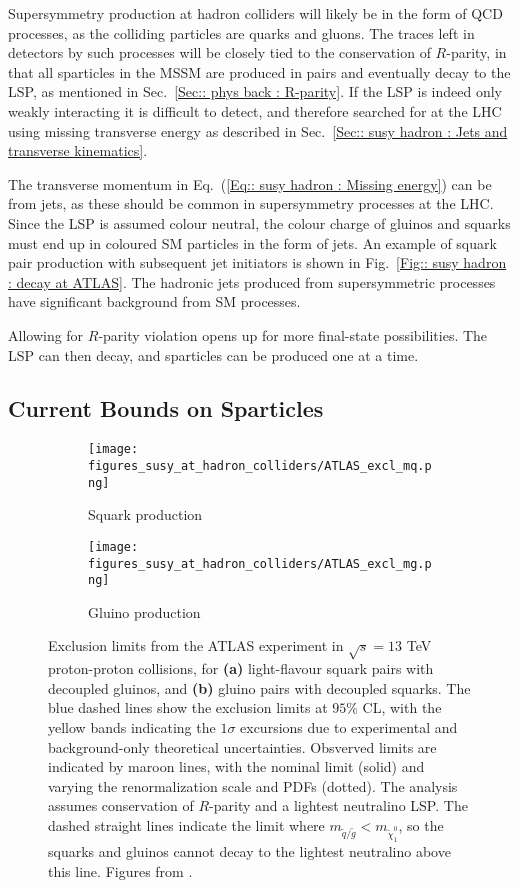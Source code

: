 \documentclass[twoside,english]{uiofysmaster}
\begin{document}
{Supersymmetry production at hadron colliders will likely be in the form of QCD processes, as the colliding particles are quarks and gluons. The traces left in detectors by such processes will be closely tied to the conservation of $R$-parity, in that all sparticles in the MSSM are produced in pairs and eventually decay to the LSP, as mentioned in Sec.~\ref{Sec:: phys back : R-parity}. If the LSP is indeed only weakly interacting it is difficult to detect, and therefore searched for at the LHC using missing transverse energy as described in Sec.~\ref{Sec:: susy hadron : Jets and transverse kinematics}. 

The transverse momentum in Eq.~(\ref{Eq:: susy hadron : Missing energy}) can be from jets, as these should be common in supersymmetry processes at the LHC. Since the LSP is assumed colour neutral, the colour charge of gluinos and squarks must end up in coloured SM particles in the form of jets. An example of squark pair production with subsequent jet initiators is shown in Fig.~\ref{Fig:: susy hadron : decay at ATLAS}. The hadronic jets produced from supersymmetric processes have significant background from SM processes. 

Allowing for $R$-parity violation opens up for more final-state possibilities. The LSP can then decay, and sparticles can be produced one at a time. 




\subsection{Current Bounds on Sparticles}\label{Sec:: susy hadron : Current Bounds on Sparticles}

\begin{figure}[H]
    \centering
    \begin{subfigure}[b]{0.8\textwidth}
        \texttt{[image: figures\_susy\_at\_hadron\_colliders/ATLAS\_excl\_mq.png]}
        \caption{Squark production}
    \end{subfigure}
    \begin{subfigure}[b]{0.8\textwidth}
        \texttt{[image: figures\_susy\_at\_hadron\_colliders/ATLAS\_excl\_mg.png]}
        \caption{Gluino production}
    \end{subfigure}
    \caption{Exclusion limits from the ATLAS experiment in $\sqrt{s} = 13$ TeV proton-proton collisions, for \textbf{(a)} light-flavour squark pairs with decoupled gluinos, and \textbf{(b)} gluino pairs with decoupled squarks. The blue dashed lines show the exclusion limits at $95\%$ CL, with the yellow bands indicating the $1\sigma$ excursions due to experimental and background-only theoretical uncertainties. Obsverved limits are indicated by maroon lines, with the nominal limit (solid) and varying the renormalization scale and PDFs (dotted). The analysis assumes conservation of $R$-parity and a lightest neutralino LSP. The dashed straight lines indicate the limit where $m_{\widetilde{q}/\widetilde{g}} < m_{\widetilde{\chi}^0_1}$, so the squarks and gluinos cannot decay to the lightest neutralino above this line. Figures from \cite{Aaboud:2016zdn}.}\label{Fig:: susy hadron : ATLAS exclusion limits}
\end{figure}


}
\end{document}
